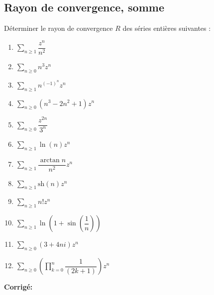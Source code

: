 \documentclass[a4paper,twoside,french,11pt]{VcCours}
\newcommand{\Sum}[2]{\sum_{#1}^{#2}}
\newcommand{\corr}{\textbf{Corrigé:}}
\begin{document}

\tableofcontents
\separationTitre

\subsection{Rayon de convergence, somme}


\begin{Exercice}{} Déterminer le rayon de convergence $R$ des séries entières suivantes :

\begin{multicols}{3}
\begin{enumerate}
\item $\Sum{n \geq 1}{} \dfrac{z^n}{n^2}$
\item $\Sum{n \geq 0}{} n^3 z^n$
\item $\Sum{n \geq 1}{} n^{(-1)^n}z^n$
\item $\Sum{n \geq 0}{} (n^3-2n^2+1)z^n$
\columnbreak
\item $\Sum{n \geq 0}{} \dfrac{z^{2n}}{3^n}$
\item $\Sum{n \geq 1}{} \ln(n) z^n$
\item $\Sum{n \geq 1}{} \dfrac{\arctan n}{n^2}z^n$
\item $\Sum{n \geq 1}{} \textrm{sh}(n) z^n$
\columnbreak
\item $\Sum{n \geq 1}{} n! z^n$
\item $\Sum{n \geq 1}{}\ln\left(1+\sin \left(\dfrac{1}{n}\right) \right)$
\item $\Sum{n \geq 0}{} (3+4ni) z^n$
\item $\Sum{n \geq 0}{}   \left(\prod_{k=0}^n\dfrac{1}{(2k+1)}\right) z^n$
\end{enumerate}
\end{multicols}


\end{Exercice}


\corr
\end{document}
